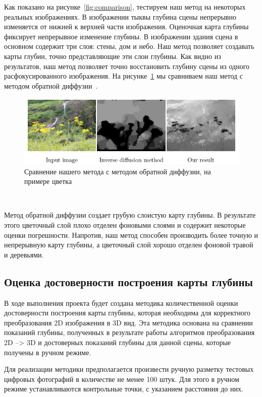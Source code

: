 Как показано на рисунке~\ref{fig:comparison}, тестируем наш метод на некоторых реальных изображениях. В изображении тыквы глубина сцены непрерывно изменяется от нижней к верхней части изображения. Оценочная карта глубины фиксирует непрерывное изменение глубины. В изображении здания сцена в основном содержит три слоя: стены, дом и небо. Наш метод позволяет создавать карты глубин, точно представляющие эти слои глубины. Как видно из результатов, наш метод позволяет точно восстановить глубину сцены из одного расфокусированного изображения. На рисунке~\ref{fig:flower} мы сравниваем наш метод с методом обратной диффузии~\cite{Proc}.

\begin{figure}[H]
	\centering
	\includegraphics[width=1\linewidth]{pics/flower}
	\caption{Сравнение нашего метода с методом обратной диффузии, на примере цветка}
	\label{fig:flower}
\end{figure}\

Метод обратной диффузии создает грубую слоистую карту глубины. В результате этого цветочный слой плохо отделен фоновыми слоями и содержит некоторые оценки погрешности. Напротив, наш метод способен производить более точную и непрерывную карту глубины, а цветочный слой хорошо отделен фоновой травой и деревьями.

\subsection{Оценка достоверности построения карты глубины}

В ходе выполнения проекта будет создана методика количественной оценки достоверности построения карты глубины, которая необходима для корректного преобразования 2D изображения в 3D вид. Эта методика основана на сравнении показаний глубины, полученных в результате работы алгоритмов преобразования 2D –> 3D и достоверных показаний глубины для данной сцены, которые получены в ручном режиме.

Для реализации методики предполагается произвести ручную разметку тестовых цифровых фотографий в количестве не менее 100 штук. Для этого в ручном режиме устанавливаются контрольные точки, с указанием расстояния до них.

